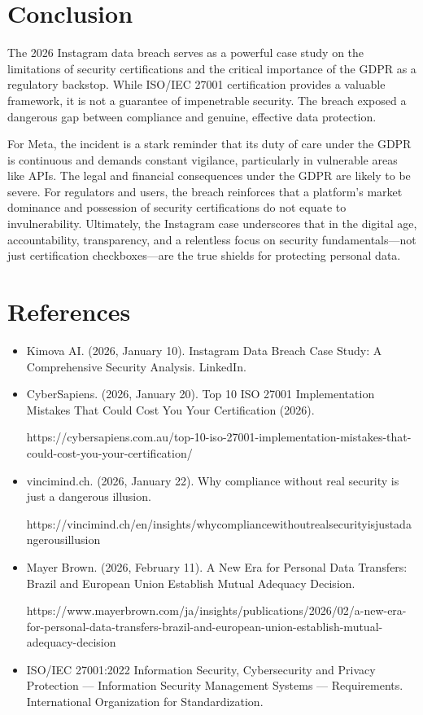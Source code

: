 \documentclass{article}
\begin{document}
\section{Conclusion}
The 2026 Instagram data breach serves as a powerful case study on the limitations of security certifications and the critical importance of the GDPR as a regulatory backstop. While ISO/IEC 27001 certification provides a valuable framework, it is not a guarantee of impenetrable security. The breach exposed a dangerous gap between compliance and genuine, effective data protection.

For Meta, the incident is a stark reminder that its duty of care under the GDPR is continuous and demands constant vigilance, particularly in vulnerable areas like APIs. The legal and financial consequences under the GDPR are likely to be severe. For regulators and users, the breach reinforces that a platform's market dominance and possession of security certifications do not equate to invulnerability. Ultimately, the Instagram case underscores that in the digital age, accountability, transparency, and a relentless focus on security fundamentals—not just certification checkboxes—are the true shields for protecting personal data.
\section{References}

\begin{itemize}
\item Kimova AI. (2026, January 10). Instagram Data Breach Case Study: A Comprehensive Security Analysis. LinkedIn.   
\item CyberSapiens. (2026, January 20). Top 10 ISO 27001 Implementation Mistakes That Could Cost You Your Certification (2026).

https://cybersapiens.com.au/top-10-iso-27001-implementation-mistakes-that-could-cost-you-your-certification/ 
\item vincimind.ch. (2026, January 22). Why compliance without real security is just a dangerous illusion. \quad 

{\small https://vincimind.ch/en/insights/whycompliancewithoutrealsecurityisjustadangerousillusion }
\item	Mayer Brown. (2026, February 11). A New Era for Personal Data Transfers: Brazil and European Union Establish Mutual Adequacy Decision. \quad 

https://www.mayerbrown.com/ja/insights/publications/2026/02/a-new-era-for-personal-data-transfers-brazil-and-european-union-establish-mutual-adequacy-decision 
\item ISO/IEC 27001:2022 Information Security, Cybersecurity and Privacy Protection — Information Security Management Systems — Requirements. International Organization for Standardization.



\end{itemize}
\end{document}
